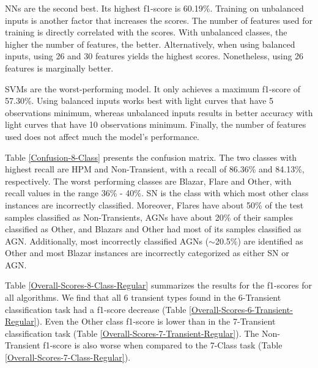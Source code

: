 \documentclass[a4paper,fleqn,usenatbib]{mnras}
\begin{document}
NNs are the second best. 
Its highest f1-score is 60.19\%. 
Training on unbalanced inputs is another factor that increases the
scores. 
The number of features used for training is directly correlated with
the scores.
With unbalanced classes, the higher the number of features, the
better. 
Alternatively, when using balanced inputs, using 26 and 30 features
yields the highest scores. 
Nonetheless, using 26 features is marginally better. 

SVMs are the worst-performing model.
It only achieves a maximum f1-score of 57.30\%.
Using balanced inputs works best with light curves that have 5 
observations minimum, whereas unbalanced inputs
results in better accuracy with light curves that have 10 observations
minimum.  
Finally, the number of features used does not affect much the model's
performance.%

Table \ref{Confusion-8-Class} presents the confusion matrix.
The two classes with highest recall are HPM and Non-Transient, with a
recall of 86.36\% and 84.13\%, respectively. 
The worst performing classes are Blazar, Flare and Other, with recall
values in the range 36\% - 40\%. 
SN is the class with which most other class instances are
incorrectly classified. 
Moreover, Flares have about 50\% of the test samples classified as
Non-Transients, AGNs have about 20\% of their 
samples classified as Other, and Blazars and Other had most of  its
samples classified as AGN. 
Additionally, most incorrectly classified AGNs ($\sim$20.5\%) are
identified as Other and most Blazar instances are
incorrectly categorized as either SN or AGN. 

Table \ref{Overall-Scores-8-Class-Regular} summarizes the results
for the f1-scores for all algorithms. 
We find that all 6 transient types found in the
6-Transient classification task had a f1-score decrease (Table
\ref{Overall-Scores-6-Transient-Regular}). 
Even the Other class f1-score is lower than in the 7-Transient classification task (Table
\ref{Overall-Scores-7-Transient-Regular}).
The Non-Transient f1-score is also worse when compared to the 7-Class
task (Table \ref{Overall-Scores-7-Class-Regular}).  
\end{document}
